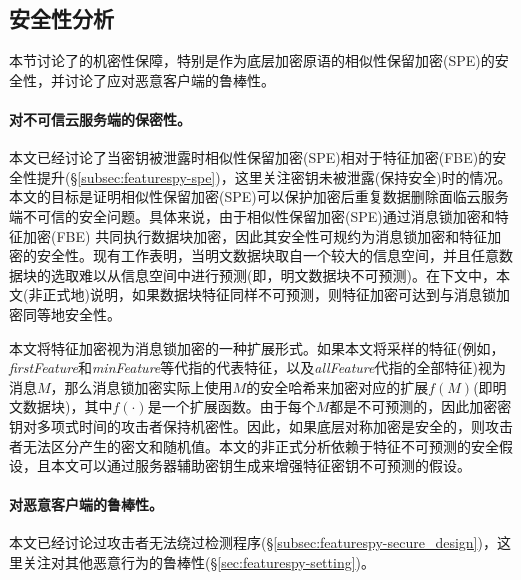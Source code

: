 
\subsection{安全性分析}
\label{subsec:featurespy-security}
本节讨论了\sysnameF 的机密性保障，特别是作为底层加密原语的相似性保留加密(SPE)的安全性，并讨论了\sysnameF 应对恶意客户端的鲁棒性。

\paragraph*{对不可信云服务端的保密性。}

本文已经讨论了当密钥被泄露时相似性保留加密(SPE)相对于特征加密(FBE)的安全性提升(\S\ref{subsec:featurespy-spe})，这里关注密钥未被泄露(保持安全)时的情况。本文的目标是证明相似性保留加密(SPE)可以保护加密后重复数据删除面临云服务端不可信的安全问题。具体来说，由于相似性保留加密(SPE)通过消息锁加密和特征加密(FBE) 共同执行数据块加密，因此其安全性可规约为消息锁加密和特征加密的安全性。现有工作表明，当明文数据块取自一个较大的信息空间，并且任意数据块的选取难以从信息空间中进行预测(即，明文数据块不可预测)。在下文中，本文(非正式地)说明，如果数据块特征同样不可预测，则特征加密可达到与消息锁加密同等地安全性。

本文将特征加密视为消息锁加密的一种扩展形式。如果本文将采样的特征(例如，\textit{firstFeature}和\textit{minFeature}等代指的代表特征，以及\textit{allFeature}代指的全部特征)视为消息$M$，那么消息锁加密实际上使用$M$的安全哈希来加密对应的扩展$f(M)$(即明文数据块)，其中$f(\cdot)$是一个扩展函数。由于每个$M$都是不可预测的，因此加密密钥对多项式时间的攻击者保持机密性。因此，如果底层对称加密是安全的，则攻击者无法区分产生的密文和随机值。本文的非正式分析依赖于特征不可预测的安全假设，且本文可以通过服务器辅助密钥生成来增强特征密钥不可预测的假设。

\paragraph*{对恶意客户端的鲁棒性。}
本文已经讨论过攻击者无法绕过检测程序(\S\ref{subsec:featurespy-secure_design})，这里关注\sysnameF 对其他恶意行为的鲁棒性(\S\ref{sec:featurespy-setting})。

